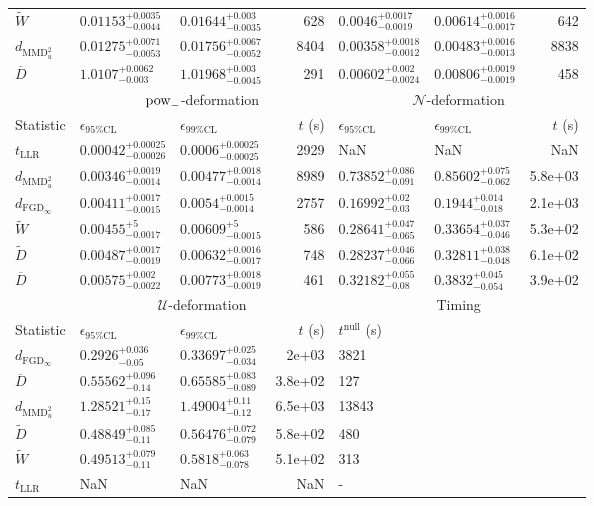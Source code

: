 \begin{tabular}{l|llr|llr}
	$\widetilde{W}$ & $0.01153_{-0.0044}^{+0.0035}$ & $0.01644_{-0.0035}^{+0.003}$ & 628 & $0.0046_{-0.0019}^{+0.0017}$ & $0.00614_{-0.0017}^{+0.0016}$ & 642 \\
	$d_{\mathrm{MMD}^{2}_{u}}$ & $0.01275_{-0.0053}^{+0.0071}$ & $0.01756_{-0.0052}^{+0.0067}$ & 8404 & $0.00358_{-0.0012}^{+0.0018}$ & $0.00483_{-0.0013}^{+0.0016}$ & 8838 \\
	$\overline{D}$ & $1.0107_{-0.003}^{+0.0062}$ & $1.01968_{-0.0045}^{+0.003}$ & 291 & $0.00602_{-0.0024}^{+0.002}$ & $0.00806_{-0.0019}^{+0.0019}$ & 458 \\
	\toprule
	\multicolumn{1}{c}{} & \multicolumn{3}{c}{$\rm{pow}_{-}$-deformation} & \multicolumn{3}{c}{$\mathcal{N}$-deformation} \\
	Statistic & $\epsilon_{95\%\mathrm{CL}}$ & $\epsilon_{99\%\mathrm{CL}}$ & $t$ (s) & $\epsilon_{95\%\mathrm{CL}}$ & $\epsilon_{99\%\mathrm{CL}}$ & $t$ (s) \\
	\midrule
	$t_{\mathrm{LLR}}$ & $0.00042_{-0.00026}^{+0.00025}$ & $0.0006_{-0.00025}^{+0.00025}$ & 2929 & NaN & NaN & NaN \\
	$d_{\mathrm{MMD}^{2}_{u}}$ & $0.00346_{-0.0014}^{+0.0019}$ & $0.00477_{-0.0014}^{+0.0018}$ & 8989 & $0.73852_{-0.091}^{+0.086}$ & $0.85602_{-0.062}^{+0.075}$ & 5.8e+03 \\
	$d_{\mathrm{FGD}_{\infty}}$ & $0.00411_{-0.0015}^{+0.0017}$ & $0.0054_{-0.0014}^{+0.0015}$ & 2757 & $0.16992_{-0.03}^{+0.02}$ & $0.1944_{-0.018}^{+0.014}$ & 2.1e+03 \\
	$\widetilde{W}$ & $0.00455_{-0.0017}^{+5}$ & $0.00609_{-0.0015}^{+5}$ & 586 & $0.28641_{-0.065}^{+0.047}$ & $0.33654_{-0.046}^{+0.037}$ & 5.3e+02 \\
	$\widetilde{D}$ & $0.00487_{-0.0019}^{+0.0017}$ & $0.00632_{-0.0017}^{+0.0016}$ & 748 & $0.28237_{-0.066}^{+0.046}$ & $0.32811_{-0.048}^{+0.038}$ & 6.1e+02 \\
	$\overline{D}$ & $0.00575_{-0.0022}^{+0.002}$ & $0.00773_{-0.0019}^{+0.0018}$ & 461 & $0.32182_{-0.08}^{+0.055}$ & $0.3832_{-0.054}^{+0.045}$ & 3.9e+02 \\
	\toprule
	\multicolumn{1}{c}{} & \multicolumn{3}{c}{$\mathcal{U}$-deformation} & \multicolumn{3}{c}{Timing} \\
	Statistic & $\epsilon_{95\%\mathrm{CL}}$ & $\epsilon_{99\%\mathrm{CL}}$ & $t$ (s) & $t^{\mathrm{null}}$ (s) \\
	\midrule
	$d_{\mathrm{FGD}_{\infty}}$ & $0.2926_{-0.05}^{+0.036}$ & $0.33697_{-0.034}^{+0.025}$ & 2e+03 & 3821 \\
	$\overline{D}$ & $0.55562_{-0.14}^{+0.096}$ & $0.65585_{-0.089}^{+0.083}$ & 3.8e+02 & 127 \\
	$d_{\mathrm{MMD}^{2}_{u}}$ & $1.28521_{-0.17}^{+0.15}$ & $1.49004_{-0.12}^{+0.11}$ & 6.5e+03 & 13843 \\
	$\widetilde{D}$ & $0.48849_{-0.11}^{+0.085}$ & $0.56476_{-0.079}^{+0.072}$ & 5.8e+02 & 480 \\
	$\widetilde{W}$ & $0.49513_{-0.11}^{+0.079}$ & $0.5818_{-0.078}^{+0.063}$ & 5.1e+02 & 313 \\
	$t_{\mathrm{LLR}}$ & NaN & NaN & NaN & - \\
	\bottomrule
\end{tabular}